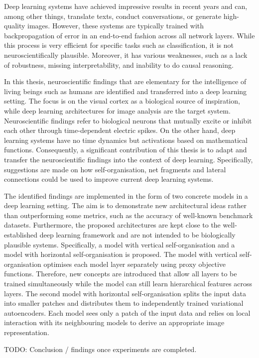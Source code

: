 Deep learning systems have achieved impressive results in recent years and can, among other things, translate texts, conduct conversations, or generate high-quality images. However, these systems are typically trained with backpropagation of error in an end-to-end fashion across all network layers. While this process is very efficient for specific tasks such as classification, it is not neuroscientifically plausible. Moreover, it has various weaknesses, such as a lack of robustness, missing interpretability, and inability to do causal reasoning.

In this thesis, neuroscientific findings that are elementary for the intelligence of living beings such as humans are identified and transferred into a deep learning setting. The focus is on the visual cortex as a biological source of inspiration, while deep learning architectures for image analysis are the target system. Neuroscientific findings refer to biological neurons that mutually excite or inhibit each other through time-dependent electric spikes. On the other hand, deep learning systems have no time dynamics but activations based on mathematical functions. Consequently, a significant contribution of this thesis is to adapt and transfer the neuroscientific findings into the context of deep learning. Specifically, suggestions are made on how self-organisation, net fragments and lateral connections could be used to improve current deep learning systems.

The identified findings are implemented in the form of two concrete models in a deep learning setting. The aim is to demonstrate new architectural ideas rather than outperforming some metrics, such as the accuracy of well-known benchmark datasets. Furthermore, the proposed architectures are kept close to the well-established deep learning framework and are not intended to be biologically plausible systems. Specifically, a model with vertical self-organisation and a model with horizontal self-organisation is proposed. The model with vertical self-organisation optimises each model layer separately using proxy objective functions. Therefore, new concepts are introduced that allow all layers to be trained simultaneously while the model can still learn hierarchical features across layers. The second model with horizontal self-organisation splits the input data into smaller patches and distributes them to independently trained variational autoencoders. Each model sees only a patch of the input data and relies on local interaction with its neighbouring models to derive an appropriate image representation.

TODO: Conclusion / findings once experiments are completed.